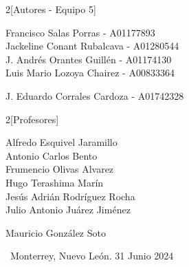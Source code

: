 \begin{titlepage}
    \begin{multicols}{2}[\Large Autores - Equipo 5]
        \begin{center} \large
            \textrm{
                Francisco Salas Porras - A01177893
                \\
                Jackeline Conant Rubalcava - A01280544
                \\
                J. Andrés Orantes Guillén - A01174130
                \\
                Luis Mario Lozoya Chairez - A00833364
            }
        \end{center}
    \end{multicols}
    \textrm{\large J. Eduardo Corrales Cardoza - A01742328\\[0.6 cm]}

    \begin{multicols}{2}[\Large Profesores]
        \begin{center} \large
            \textrm{
                Alfredo Esquivel Jaramillo\\[0.1em]
                Antonio Carlos Bento\\[0.1em]
                Frumencio Olivas Alvarez\\[0.1em]
                Hugo Terashima Marín\\[0.1em]
                Jesús Adrián Rodríguez Rocha\\[0.1em]
                Julio Antonio Juárez Jiménez
            }
        \end{center}
    \end{multicols}
    \textrm{\large Mauricio González Soto\\[1cm]}

    \makeatother


    \vfill

    {\large \ Monterrey, Nuevo León. 31 Junio 2024}\\[0.5 cm] %
    \break
    \vfill %

\end{titlepage}